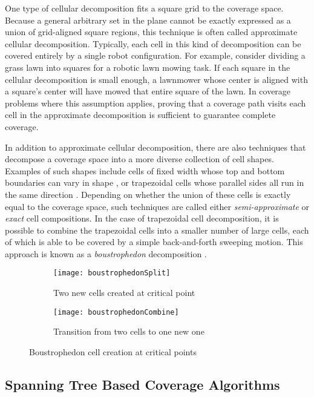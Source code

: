 One type of cellular decomposition fits a square grid to the coverage space. Because a general arbitrary set in the plane cannot be exactly expressed as a union of grid-aligned square regions, this technique is often called approximate cellular decomposition. Typically, each cell in this kind of decomposition can be covered entirely by a single robot configuration. For example, consider dividing a grass lawn into squares for a robotic lawn mowing task. If each square in the cellular decomposition is small enough, a lawnmower whose center is aligned with a square's center will have mowed that entire square of the lawn. In coverage problems where this assumption applies, proving that a coverage path visits each cell in the approximate decomposition is sufficient to guarantee complete coverage.

In addition to approximate cellular decomposition, there are also techniques that decompose a coverage space into a more diverse collection of cell shapes. Examples of such shapes include cells of fixed width whose top and bottom boundaries can vary in shape \cite{Hert1996}, or trapezoidal cells whose parallel sides all run in the same direction \cite{Choset-2000}. Depending on whether the union of these cells is exactly equal to the coverage space, such techniques are called either \textit{semi-approximate} or \textit{exact} cell compositions. In the case of trapezoidal cell decomposition, it is possible to combine the trapezoidal cells into a smaller number of large cells, each of which is able to be covered by a simple back-and-forth sweeping motion. This approach is known as a \textit{boustrophedon} decomposition \cite{Choset-2000}.

\begin{figure}[H]
\begin{subfigure}{.5\textwidth}
  \centering
  \texttt{[image: boustrophedonSplit]}
  \caption{Two new cells created at critical point}
\end{subfigure}
\begin{subfigure}{.5\textwidth}
  \centering
  \texttt{[image: boustrophedonCombine]}
  \caption{Transition from two cells to one new one}
\end{subfigure}
\caption[Boustrophedon Decomposition]{Boustrophedon cell creation at critical points}
\end{figure}

\subsection{Spanning Tree Based Coverage Algorithms}

